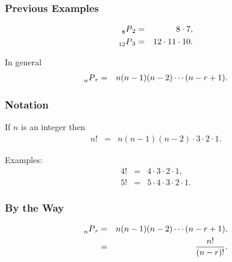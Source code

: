 \begin{frame}
  \frametitle{Previous Examples}

  \begin{eqnarray*}
    \prescript{~}{8}{P}_2 & = & 8\cdot 7, \\
    \prescript{~}{12}{P}_3 & = & 12\cdot 11 \cdot 10. \\
  \end{eqnarray*}


  {

    \begin{definition}

      In general
      \begin{eqnarray*}
        \prescript{~}{n}{P}_r & = & n(n-1)(n-2)\cdots(n-r+1).
      \end{eqnarray*}

      
    \end{definition}

  }
  
\end{frame}

\begin{frame}
  \frametitle{Notation}

  \begin{definition}[Factorials]

    If $n$ is an integer then
    \begin{eqnarray}
      n! & = & n(n-1)(n-2)\cdot 3 \cdot 2 \cdot 1.
    \end{eqnarray}
    
  \end{definition}

  Examples:
  \begin{eqnarray}
    4! & = & 4 \cdot 3  \cdot 2 \cdot 1, \\
    5! & = & 5 \cdot 4 \cdot 3  \cdot 2 \cdot 1.
  \end{eqnarray}
  
\end{frame}



\begin{frame}
  \frametitle{By the Way}

      \begin{eqnarray*}
        \prescript{~}{n}{P}_r & = & n(n-1)(n-2)\cdots(n-r+1), \\
        & = & \frac{n!}{(n-r)!}.
      \end{eqnarray*}

  
\end{frame}

